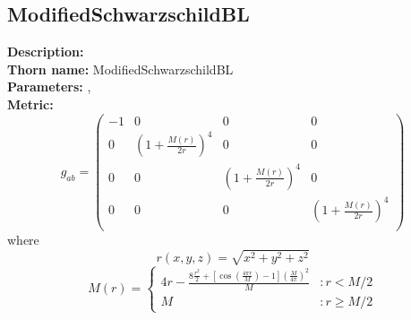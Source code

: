 \subsection{ModifiedSchwarzschildBL}
{\bf Description:}   \\
{\bf Thorn name:} ModifiedSchwarzschildBL \\
{\bf Parameters:} ,  \\
{\bf Metric:} \\
\begin{equation}
g_{ab} =
\left(
\begin{array}{cccc}
 -1 & 0 & 0 & 0 \\
 0 & \left(1+\frac{M(r)}{2 r}\right)^4 & 0 & 0 \\
 0 & 0 & \left(1+\frac{M(r)}{2 r}\right)^4 & 0 \\
 0 & 0 & 0 & \left(1+\frac{M(r)}{2 r}\right)^4 \\
\end{array}
\right)
\end{equation}
where
\begin{equation}
r(x,y,z)=\sqrt{x^2+y^2+z^2}
\end{equation}
\begin{equation}
M(r) = \left\{
     \begin{array}{lr}
       4 r - \frac{8 \frac{r^2}{2} + [\cos(\frac{4 \pi r}{M}) - 1] \left(\frac{M}{4 \pi}\right)^2}{M} & : r < M/2\\
       M & : r \ge M/2
     \end{array}
   \right.
\end{equation}
